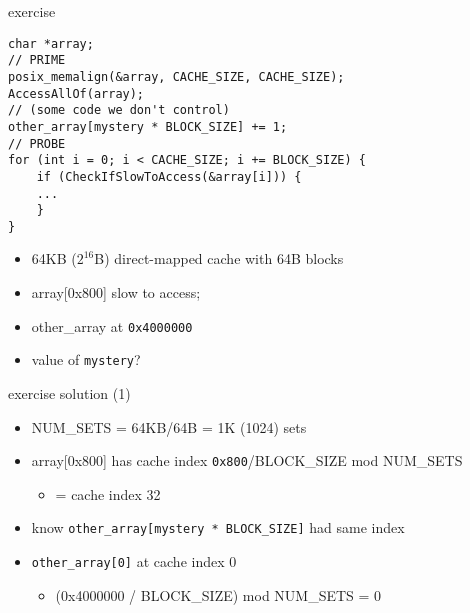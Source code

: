 \begin{frame}[fragile]{exercise}
\begin{Verbatim}[fontsize=\fontsize{9}{10}]
char *array;
// PRIME
posix_memalign(&array, CACHE_SIZE, CACHE_SIZE);
AccessAllOf(array);
// (some code we don't control)
other_array[mystery * BLOCK_SIZE] += 1;
// PROBE
for (int i = 0; i < CACHE_SIZE; i += BLOCK_SIZE) {
    if (CheckIfSlowToAccess(&array[i])) {
    ...
    }
}
\end{Verbatim}
\begin{itemize}
\item 64KB ($2^{16}$B) direct-mapped cache with 64B blocks
\item array[0x800] slow to access; \item other\_array at \texttt{0x4000000}
\item value of \texttt{mystery}?
\end{itemize}
\end{frame}

\begin{frame}[fragile]{exercise solution (1)}
\begin{itemize}
\item NUM\_SETS = 64KB/64B = 1K (1024) sets
\item array[0x800] has cache index {\small \texttt{0x800}/BLOCK\_SIZE mod NUM\_SETS}
    \begin{itemize}
    \item = cache index 32
    \end{itemize}
\item know \texttt{\small other\_array[mystery * BLOCK\_SIZE]} had same index
\vspace{.5cm}
\item \texttt{other\_array[0]} at cache index 0
    \begin{itemize}
    \item (0x4000000 / BLOCK\_SIZE) mod NUM\_SETS = 0
    \end{itemize}
\end{itemize}
\end{frame}

